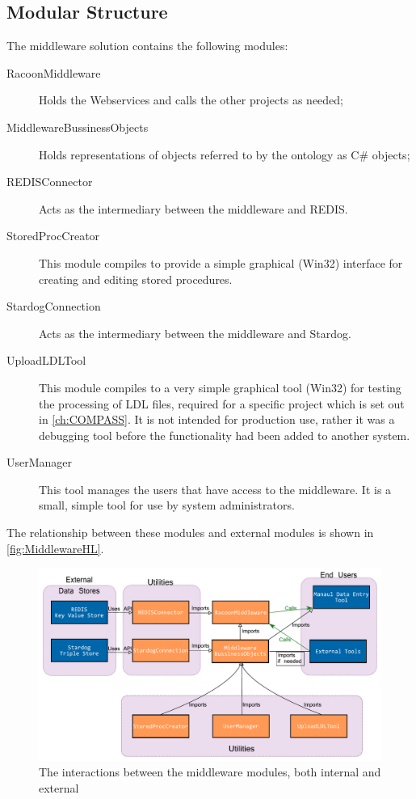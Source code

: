 \subsection{Modular Structure}
The middleware solution contains the following modules:
\begin{description}
    \item[RacoonMiddleware] Holds the Webservices and calls the other projects as needed;
    \item[MiddlewareBussinessObjects] Holds representations of objects referred to by the ontology as C\# objects;     
    \item[REDISConnector] Acts as the intermediary between the middleware and REDIS.
    \item[StoredProcCreator]
    This module compiles to provide a simple graphical (Win32) interface for creating and editing stored procedures. 
    \item[StardogConnection]  Acts as the intermediary between the middleware and Stardog.    
    \item[UploadLDLTool]
    This module compiles to a very simple graphical tool (Win32) for testing the processing of LDL files, required for a specific project which is set out in  \autoref{ch:COMPASS}. It is not intended for production use, rather it was a debugging tool before the functionality had been added to another system.
    \item[UserManager]
    This tool manages the users that have access to the middleware. It is a small, simple tool for use by system administrators.
\end{description}

The relationship between these modules and external modules is shown in \autoref{fig:MiddlewareHL}.

\begin{figure}
\myfloatalign
\includegraphics[max height=0.9\textwidth]{gfx/MiddlewareHighLevel}
\caption{The interactions between the middleware modules, both internal and external}
\label{fig:MiddlewareHL}
\end{figure}

